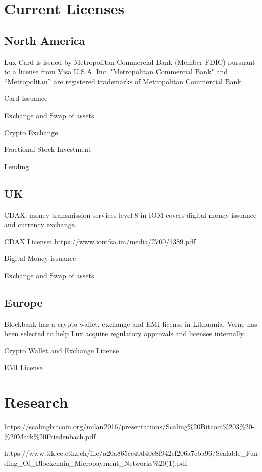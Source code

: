 \documentclass[11pt]{article}
\begin{document}
\section{Current Licenses}

\subsection{North America}

Lux Card is issued by Metropolitan Commercial Bank (Member FDIC) pursuant to a license from Visa U.S.A. Inc. "Metropolitan Commercial Bank" and ``Metropolitan'' are registered trademarks of Metropolitan Commercial Bank.


Card Issuance


Exchange and Swap of assets


Crypto Exchange


Fractional Stock Investment


Lending


\subsection{UK}

CDAX, money transmission services level 8 in IOM covers digital money issuance and currency exchange.


CDAX License: https://www.iomfsa.im/media/2700/1389.pdf


Digital Money issuance


Exchange and Swap of assets


\subsection{Europe}

Blockbank has a crypto wallet, exchange and EMI license in Lithuania. Verne has been selected to help Lux acquire regulatory approvals and licenses internally.


Crypto Wallet and Exchange License


EMI License


\section{Research}

https://scalingbitcoin.org/milan2016/presentations/Scaling\%20Bitcoin\%203\%20-\%20Mark\%20Friedenbach.pdf


https://www.tik.ee.ethz.ch/file/a20a865ce40d40c8f942cf206a7cba96/Scalable\_Funding\_Of\_Blockchain\_Micropayment\_Networks\%20(1).pdf
\end{document}
